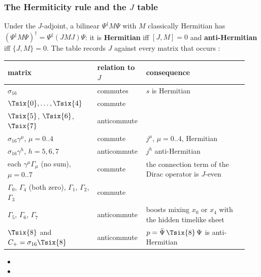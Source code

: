 \subsubsection{The Hermiticity rule and the \texorpdfstring{$J$}{J} table}
\label{sec:3.5.8}

Under the $J$-adjoint, a bilinear $\Psi^{\ddagger}M\Psi$ with $M$ classically Hermitian has
$(\Psi^{\ddagger}M\Psi)^{\dagger}=\Psi^{\ddagger}(JMJ)\Psi$: it is \textbf{Hermitian} iff $[J,M]=0$ and
\textbf{anti-Hermitian} iff $\{J,M\}=0$. The table records $J$ against every matrix that occurs
:

{\small
\begin{longtable}{@{}p{0.36\linewidth}p{0.17\linewidth}p{0.41\linewidth}@{}}
\toprule
\raggedright matrix & \raggedright relation to $J$ & \raggedright consequence \tabularnewline
\midrule
\endhead
\raggedright $\sigma_{16}$ & \raggedright commutes & \raggedright $s$ is Hermitian \tabularnewline
\raggedright $\Tsix{0},\dots,\Tsix{4}$ & \raggedright commute & \tabularnewline
\raggedright $\Tsix{5}$, $\Tsix{6}$, $\Tsix{7}$ & \raggedright anticommute & \tabularnewline
\raggedright $\sigma_{16}\gamma^\mu$, $\mu=0..4$ & \raggedright commute & \raggedright $j^\mu$, $\mu=0..4$, Hermitian \tabularnewline
\raggedright $\sigma_{16}\gamma^h$, $h=5,6,7$ & \raggedright anticommute & \raggedright $j^h$ anti-Hermitian \tabularnewline
\raggedright each $\gamma^\mu\Gamma_\mu$ (no sum), $\mu=0..7$ & \raggedright commute & \raggedright the connection term of the Dirac operator is $J$-even \tabularnewline
\raggedright $\Gamma_0$, $\Gamma_4$ (both zero), $\Gamma_1$, $\Gamma_2$, $\Gamma_3$ & \raggedright commute & \tabularnewline
\raggedright $\Gamma_5$, $\Gamma_6$, $\Gamma_7$ & \raggedright anticommute & \raggedright boosts mixing $x_0$ or $x_4$ with the hidden timelike sheet \tabularnewline
\raggedright $\Tsix{8}$ and $C_+=\sigma_{16}\Tsix{8}$ & \raggedright anticommute & \raggedright $p=\bar\Psi\,\Tsix{8}\,\Psi$ is anti-Hermitian \tabularnewline
\bottomrule
\end{longtable}
}
\begin{itemize}
  \item {}
  \item {}
\end{itemize}
